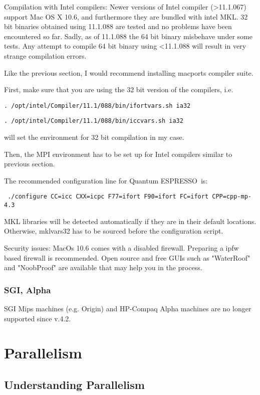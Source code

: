 \documentclass[12pt,a4paper]{article}
\def\qe{{\sc Quantum ESPRESSO}}
\begin{document}
Compilation with Intel compilers:
Newer versions of Intel compiler (>11.1.067) support Mac OS X 10.6, and furthermore they are
bundled with intel MKL. 32 bit binaries obtained using 11.1.088 are tested and no problems
have been encountered so far. Sadly, as of 11.1.088 the 64 bit binary misbehave 
under some tests. Any attempt to compile 64 bit binary using <11.1.088 will result in
very strange compilation errors.   

Like the previous section, I would recommend installing macports compiler suite. 

First, make sure that you are using the 32 bit version of the compilers,
i.e.  
\begin{verbatim}
. /opt/intel/Compiler/11.1/088/bin/ifortvars.sh ia32
\end{verbatim}
\begin{verbatim}
. /opt/intel/Compiler/11.1/088/bin/iccvars.sh ia32
\end{verbatim}
will set the environment for 32 bit compilation in my case. 

Then, the MPI environment has to be set up for Intel compilers similar to previous 
section. 

The recommended configuration line for \qe\ is: 
\begin{verbatim}
 ./configure CC=icc CXX=icpc F77=ifort F90=ifort FC=ifort CPP=cpp-mp-4.3
\end{verbatim}
MKL libraries will be detected automatically if they are in their default locations. 
Otherwise, mklvars32 has to be sourced before the configuration script. 

Security issues: 
MacOs 10.6 comes with a disabled firewall. Preparing a ipfw based firewall is recommended. 
Open source and free GUIs such as "WaterRoof" and "NoobProof" are available that may help 
you in the process.

\subsubsection{SGI, Alpha}

SGI Mips machines (e.g. Origin) and HP-Compaq Alpha machines are
no longer supported since v.4.2.

\newpage

\section{Parallelism}
\label{Sec:para}

\subsection{Understanding Parallelism}
\end{document}
